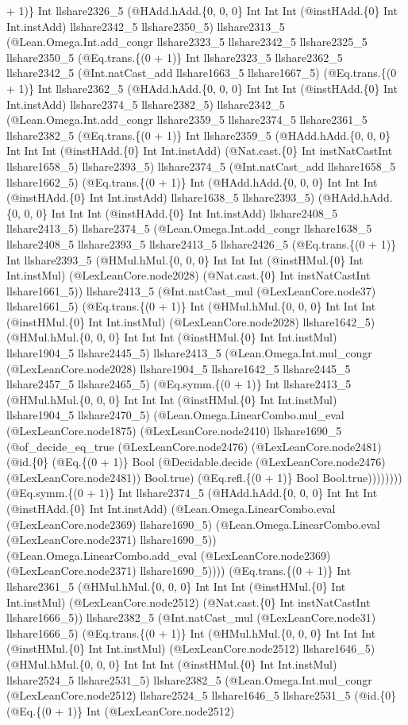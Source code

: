 \documentclass[11pt]{article}
\begin{document}
+ 1)\} Int llshare2326\_5 (@HAdd.hAdd.\{0, 0, 0\} Int Int Int (@instHAdd.\{0\} Int Int.instAdd) llshare2342\_5 llshare2350\_5) llshare2313\_5 (@Lean.Omega.Int.add\_congr llshare2323\_5 llshare2342\_5 llshare2325\_5 llshare2350\_5 (@Eq.trans.\{(0 + 1)\} Int llshare2323\_5 llshare2362\_5 llshare2342\_5 (@Int.natCast\_add llshare1663\_5 llshare1667\_5) (@Eq.trans.\{(0 + 1)\} Int llshare2362\_5 (@HAdd.hAdd.\{0, 0, 0\} Int Int Int (@instHAdd.\{0\} Int Int.instAdd) llshare2374\_5 llshare2382\_5) llshare2342\_5 (@Lean.Omega.Int.add\_congr llshare2359\_5 llshare2374\_5 llshare2361\_5 llshare2382\_5 (@Eq.trans.\{(0 + 1)\} Int llshare2359\_5 (@HAdd.hAdd.\{0, 0, 0\} Int Int Int (@instHAdd.\{0\} Int Int.instAdd) (@Nat.cast.\{0\} Int instNatCastInt llshare1658\_5) llshare2393\_5) llshare2374\_5 (@Int.natCast\_add llshare1658\_5 llshare1662\_5) (@Eq.trans.\{(0 + 1)\} Int (@HAdd.hAdd.\{0, 0, 0\} Int Int Int (@instHAdd.\{0\} Int Int.instAdd) llshare1638\_5 llshare2393\_5) (@HAdd.hAdd.\{0, 0, 0\} Int Int Int (@instHAdd.\{0\} Int Int.instAdd) llshare2408\_5 llshare2413\_5) llshare2374\_5 (@Lean.Omega.Int.add\_congr llshare1638\_5 llshare2408\_5 llshare2393\_5 llshare2413\_5 llshare2426\_5 (@Eq.trans.\{(0 + 1)\} Int llshare2393\_5 (@HMul.hMul.\{0, 0, 0\} Int Int Int (@instHMul.\{0\} Int Int.instMul) (@LexLeanCore.node2028) (@Nat.cast.\{0\} Int instNatCastInt llshare1661\_5)) llshare2413\_5 (@Int.natCast\_mul (@LexLeanCore.node37) llshare1661\_5) (@Eq.trans.\{(0 + 1)\} Int (@HMul.hMul.\{0, 0, 0\} Int Int Int (@instHMul.\{0\} Int Int.instMul) (@LexLeanCore.node2028) llshare1642\_5) (@HMul.hMul.\{0, 0, 0\} Int Int Int (@instHMul.\{0\} Int Int.instMul) llshare1904\_5 llshare2445\_5) llshare2413\_5 (@Lean.Omega.Int.mul\_congr (@LexLeanCore.node2028) llshare1904\_5 llshare1642\_5 llshare2445\_5 llshare2457\_5 llshare2465\_5) (@Eq.symm.\{(0 + 1)\} Int llshare2413\_5 (@HMul.hMul.\{0, 0, 0\} Int Int Int (@instHMul.\{0\} Int Int.instMul) llshare1904\_5 llshare2470\_5) (@Lean.Omega.LinearCombo.mul\_eval (@LexLeanCore.node1875) (@LexLeanCore.node2410) llshare1690\_5 (@of\_decide\_eq\_true (@LexLeanCore.node2476) (@LexLeanCore.node2481) (@id.\{0\} (@Eq.\{(0 + 1)\} Bool (@Decidable.decide (@LexLeanCore.node2476) (@LexLeanCore.node2481)) Bool.true) (@Eq.refl.\{(0 + 1)\} Bool Bool.true)))))))) (@Eq.symm.\{(0 + 1)\} Int llshare2374\_5 (@HAdd.hAdd.\{0, 0, 0\} Int Int Int (@instHAdd.\{0\} Int Int.instAdd) (@Lean.Omega.LinearCombo.eval (@LexLeanCore.node2369) llshare1690\_5) (@Lean.Omega.LinearCombo.eval (@LexLeanCore.node2371) llshare1690\_5)) (@Lean.Omega.LinearCombo.add\_eval (@LexLeanCore.node2369) (@LexLeanCore.node2371) llshare1690\_5)))) (@Eq.trans.\{(0 + 1)\} Int llshare2361\_5 (@HMul.hMul.\{0, 0, 0\} Int Int Int (@instHMul.\{0\} Int Int.instMul) (@LexLeanCore.node2512) (@Nat.cast.\{0\} Int instNatCastInt llshare1666\_5)) llshare2382\_5 (@Int.natCast\_mul (@LexLeanCore.node31) llshare1666\_5) (@Eq.trans.\{(0 + 1)\} Int (@HMul.hMul.\{0, 0, 0\} Int Int Int (@instHMul.\{0\} Int Int.instMul) (@LexLeanCore.node2512) llshare1646\_5) (@HMul.hMul.\{0, 0, 0\} Int Int Int (@instHMul.\{0\} Int Int.instMul) llshare2524\_5 llshare2531\_5) llshare2382\_5 (@Lean.Omega.Int.mul\_congr (@LexLeanCore.node2512) llshare2524\_5 llshare1646\_5 llshare2531\_5 (@id.\{0\} (@Eq.\{(0 + 1)\} Int (@LexLeanCore.node2512) 
\end{document}
